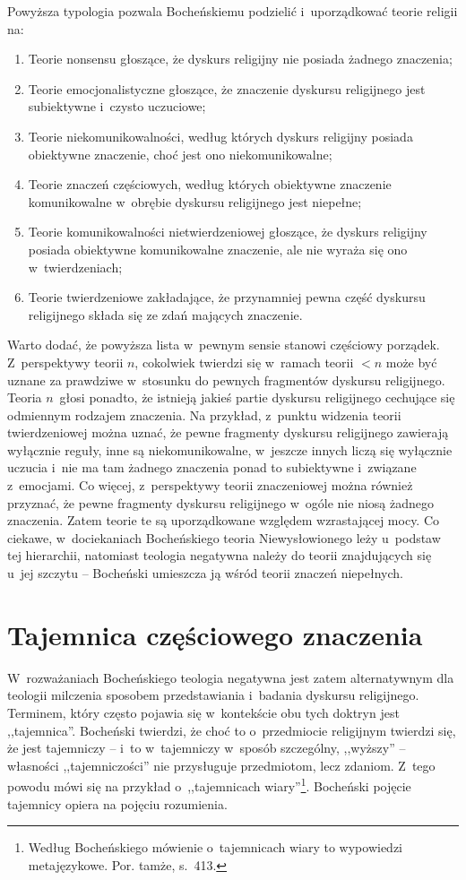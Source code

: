 Powyższa typologia pozwala Bocheńskiemu podzielić i~uporządkować teorie religii na:

\begin{enumerate}
\item Teorie nonsensu głoszące, że dyskurs religijny nie posiada żadnego znaczenia;
\item Teorie emocjonalistyczne głoszące, że znaczenie dyskursu religijnego jest subiektywne i~czysto uczuciowe;
\item Teorie niekomunikowalności, według których dyskurs religijny posiada obiektywne znaczenie, choć jest ono niekomunikowalne;
\item Teorie znaczeń częściowych, według których obiektywne znaczenie komunikowalne w~obrębie dyskursu religijnego jest niepełne;
\item Teorie komunikowalności nietwierdzeniowej głoszące, że dyskurs religijny posiada obiektywne komunikowalne znaczenie, ale nie wyraża się ono w~twierdzeniach;
\item Teorie twierdzeniowe zakładające, że przynamniej pewna część dyskursu religijnego składa się ze zdań mających znaczenie.
\end{enumerate}
Warto dodać, że powyższa lista w~pewnym sensie stanowi częściowy porządek. Z~perspektywy teorii $n$, cokolwiek twierdzi się w~ramach teorii $<n$ może być uznane za prawdziwe w~stosunku do pewnych fragmentów dyskursu religijnego. Teoria $n$~głosi ponadto, że istnieją jakieś partie dyskursu religijnego cechujące się odmiennym rodzajem znaczenia. Na przykład, z~punktu widzenia teorii twierdzeniowej można uznać, że pewne fragmenty dyskursu religijnego zawierają wyłącznie reguły, inne są niekomunikowalne, w~jeszcze innych liczą się wyłącznie uczucia i~nie ma tam żadnego znaczenia ponad to subiektywne i~związane z~emocjami. Co więcej, z~perspektywy teorii znaczeniowej można również przyznać, że pewne fragmenty dyskursu religijnego w~ogóle nie niosą żadnego znaczenia. Zatem teorie te są uporządkowane względem wzrastającej mocy. Co ciekawe, w~dociekaniach Bocheńskiego teoria Niewysłowionego leży u~podstaw tej hierarchii, natomiast teologia negatywna należy do teorii znajdujących się u~jej szczytu -- Bocheński umieszcza ją wśród teorii znaczeń niepełnych.


\section{Tajemnica częściowego znaczenia}

W~rozważaniach Bocheńskiego teologia negatywna jest zatem alternatywnym dla teologii milczenia sposobem przedstawiania i~badania dyskursu religijnego. Terminem, który często pojawia się w~kontekście obu tych doktryn jest ,,tajemnica''. Bocheński twierdzi, że choć to o~przedmiocie religijnym twierdzi się, że jest tajemniczy -- i~to w~tajemniczy w~sposób szczególny, ,,wyższy'' -- własności ,,tajemniczości'' nie przysługuje przedmiotom, lecz zdaniom. Z~tego powodu mówi się na przykład o~,,tajemnicach wiary''\footnote{Według Bocheńskiego mówienie o~tajemnicach wiary to wypowiedzi metajęzykowe. Por. tamże, s.~413.}. Bocheński pojęcie tajemnicy opiera na pojęciu rozumienia.

